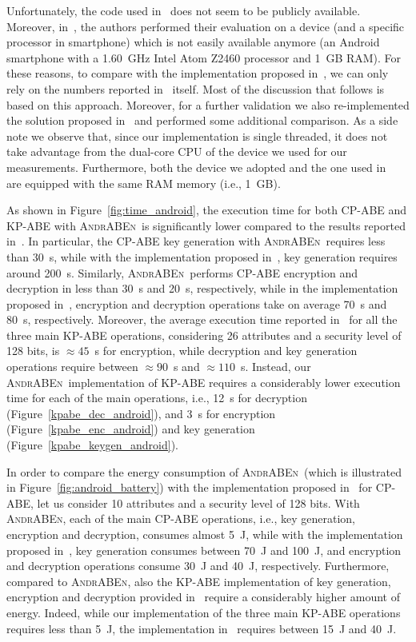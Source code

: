 \documentclass{sig-alternate-2013}
\newcommand{\andraben}{\textsc{AndrABEn}}
\begin{document}
Unfortunately, the code used in~\cite{ABE_icc_2014} does not seem to be publicly available. Moreover, in~\cite{ABE_icc_2014}, the authors performed their evaluation on a device (and a specific processor in smartphone) which is not easily available anymore (an Android smartphone with a 1.60~GHz Intel Atom Z2460 processor and 1~GB RAM). For these reasons, to compare with the implementation proposed in~\cite{ABE_icc_2014}, we can only rely on the numbers reported in~\cite{ABE_icc_2014} itself. 
Most of the discussion that follows is based on this approach. Moreover, for a further validation we also re-implemented the solution proposed in~\cite{ABE_icc_2014} and performed some additional comparison.
As a side note we observe that, since our implementation is single threaded, it does not take advantage from the dual-core CPU of the device we used for our measurements. Furthermore, both the device we adopted and the one used in~\cite{ABE_icc_2014} are equipped with the same RAM memory (i.e., 1~GB).





As shown in Figure~\ref{fig:time_android}, the execution time for both CP-ABE and KP-ABE with \andraben~is significantly lower compared to the results reported in~\cite{ABE_icc_2014}. In particular, the CP-ABE key generation with \andraben~requires less than 30~s, while with the implementation proposed in~\cite{ABE_icc_2014}, key generation requires around 200~s. Similarly, \andraben~performs CP-ABE encryption and decryption in less than 30~s and 20~s, respectively, while in the implementation proposed in~\cite{ABE_icc_2014}, encryption and decryption operations take on average 70~s and 80~s, respectively. 
Moreover, the average execution time reported in~\cite{ABE_icc_2014} for all the three main KP-ABE operations, considering 26 attributes and a security level of 128 bits, is $\approx45$~s for encryption, while decryption and key generation operations require between $\approx90$~s and $\approx110$~s. Instead, our \andraben~implementation of KP-ABE requires a considerably lower execution time for each of the main operations, i.e., 12~s for decryption (Figure~\ref{kpabe_dec_android}), and 3~s for encryption (Figure~\ref{kpabe_enc_android}) and key generation (Figure~\ref{kpabe_keygen_android}).

In order to compare the energy consumption of \andraben~(which is illustrated in Figure~\ref{fig:android_battery}) with the implementation proposed in~\cite{ABE_icc_2014} for CP-ABE, let us consider 10 attributes and a security level of 128 bits. With \andraben, each of the main CP-ABE operations, i.e., key generation, encryption and decryption, consumes almost 5~J, while with the implementation proposed in~\cite{ABE_icc_2014}, key generation consumes between 70~J and 100~J, and encryption and decryption operations consume 30~J and 40~J, respectively.
Furthermore, compared to \andraben, also the KP-ABE implementation of key generation, encryption and decryption provided in~\cite{ABE_icc_2014} require a considerably higher amount of energy. Indeed, while our implementation of the three main KP-ABE operations requires less than 5~J, the implementation in~\cite{ABE_icc_2014} requires between 15~J and 40~J.
\end{document}
